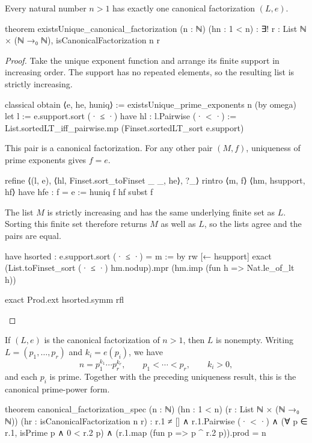 \begin{corollary}
  \label{ent:cor:unique-canonical-factorization}
  Every natural number $n>1$ has exactly one canonical factorization $(L,e)$.

  \begin{lean}
    theorem existsUnique_canonical_factorization (n : ℕ) (hn : 1 < n) :
        ∃! r : List ℕ × (ℕ →₀ ℕ), isCanonicalFactorization n r
  \end{lean}
\end{corollary}

\begin{proof}
  Take the unique exponent function and arrange its finite support in increasing order.
  The support has no repeated elements, so the resulting list is strictly increasing.

  \begin{lean}
    classical
    obtain ⟨e, he, huniq⟩ := existsUnique_prime_exponents n (by omega)
    let l := e.support.sort (· ≤ ·)
    have hl : l.Pairwise (· < ·) :=
      List.sortedLT_iff_pairwise.mp (Finset.sortedLT_sort e.support)
  \end{lean}

  This pair is a canonical factorization.
  For any other pair $(M,f)$, uniqueness of prime exponents gives $f=e$.

  \begin{lean}
    refine ⟨(l, e), ⟨hl, Finset.sort_toFinset _ _, he⟩, ?_⟩
    rintro ⟨m, f⟩ ⟨hm, hsupport, hf⟩
    have hfe : f = e := huniq f hf
    subst f
  \end{lean}

  The list $M$ is strictly increasing and has the same underlying finite set as $L$.
  Sorting this finite set therefore returns $M$ as well as $L$, so the lists agree and the pairs
  are equal.

  \begin{lean}
    have hsorted : e.support.sort (· ≤ ·) = m := by
      rw [← hsupport]
      exact (List.toFinset_sort (· ≤ ·) hm.nodup).mpr
        (hm.imp (fun h => Nat.le_of_lt h))

    exact Prod.ext hsorted.symm rfl
  \end{lean}

\end{proof}

\begin{corollary}
  \label{ent:cor:canonical-factorization-product}
  If $(L,e)$ is the canonical factorization of $n>1$, then $L$ is nonempty.
  Writing
  $L=(p_1,\ldots,p_r)$ and $k_i=e(p_i)$, we have
  \[
    n=p_1^{k_1}\cdots p_r^{k_r},\qquad
    p_1<\cdots<p_r,\qquad k_i>0,
  \]
  and each $p_i$ is prime.
  Together with the preceding uniqueness result, this is the canonical prime-power form.

  \begin{lean}
    theorem canonical_factorization_spec (n : ℕ) (hn : 1 < n)
        (r : List ℕ × (ℕ →₀ ℕ)) (hr : isCanonicalFactorization n r) :
        r.1 ≠ [] ∧ r.1.Pairwise (· < ·) ∧
          (∀ p ∈ r.1, isPrime p ∧ 0 < r.2 p) ∧
          (r.1.map (fun p => p ^ r.2 p)).prod = n
  \end{lean}
\end{corollary}

